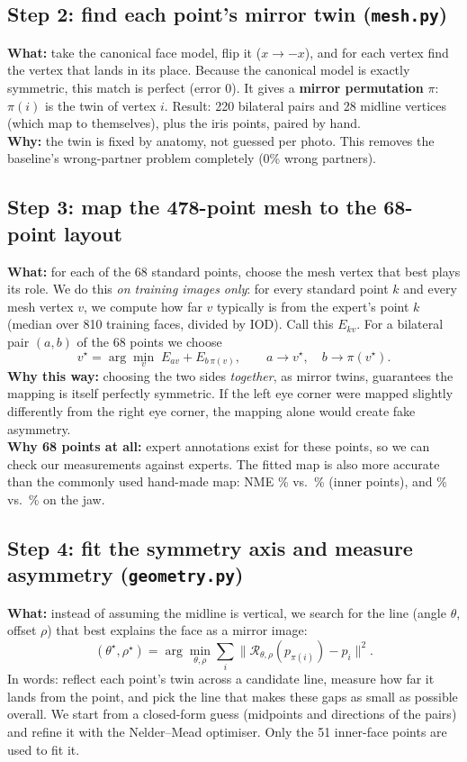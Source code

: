 \subsection{Step 2: find each point's mirror twin (\texttt{mesh.py})}\label{sec:perm}
\textbf{What:} take the canonical face model, flip it ($x\to -x$), and for each vertex find the
vertex that lands in its place. Because the canonical model is exactly symmetric, this
match is perfect (error 0). It gives a \textbf{mirror permutation} $\pi$: $\pi(i)$ is the
twin of vertex $i$. Result: 220 bilateral pairs and 28 midline vertices (which map to
themselves), plus the iris points, paired by hand.\\
\textbf{Why:} the twin is fixed by anatomy, not guessed per photo. This removes the
baseline's wrong-partner problem completely (0\% wrong partners).

\subsection{Step 3: map the 478-point mesh to the 68-point layout}
\textbf{What:} for each of the 68 standard points, choose the mesh vertex that best plays its
role. We do this \emph{on training images only}: for every standard point $k$ and every mesh
vertex $v$, we compute how far $v$ typically is from the expert's point $k$ (median over
810 training faces, divided by IOD). Call this $E_{kv}$. For a bilateral pair $(a,b)$ of the
68 points we choose
\[ v^\star = \arg\min_v \; E_{a v} + E_{b\,\pi(v)}, \qquad a \to v^\star, \quad b \to \pi(v^\star). \]
\textbf{Why this way:} choosing the two sides \emph{together}, as mirror twins, guarantees
the mapping is itself perfectly symmetric. If the left eye corner were mapped slightly
differently from the right eye corner, the mapping alone would create fake asymmetry.\\
\textbf{Why 68 points at all:} expert annotations exist for these points, so we can check our
measurements against experts. The fitted map is also more accurate than the commonly used
hand-made map: NME \nmeFitInner\% vs.\ \nmeHandInner\% (inner points), and \nmeFitJaw\% vs.\
\nmeHandJaw\% on the jaw.

\subsection{Step 4: fit the symmetry axis and measure asymmetry (\texttt{geometry.py})}
\textbf{What:} instead of assuming the midline is vertical, we search for the line (angle
$\theta$, offset $\rho$) that best explains the face as a mirror image:
\[ (\theta^\star,\rho^\star)=\arg\min_{\theta,\rho}\sum_{i}\big\|\mathcal{R}_{\theta,\rho}(p_{\pi(i)})-p_i\big\|^2 . \]
In words: reflect each point's twin across a candidate line, measure how far it lands from
the point, and pick the line that makes these gaps as small as possible overall. We start
from a closed-form guess (midpoints and directions of the pairs) and refine it with the
Nelder--Mead optimiser. Only the 51 inner-face points are used to fit it.

